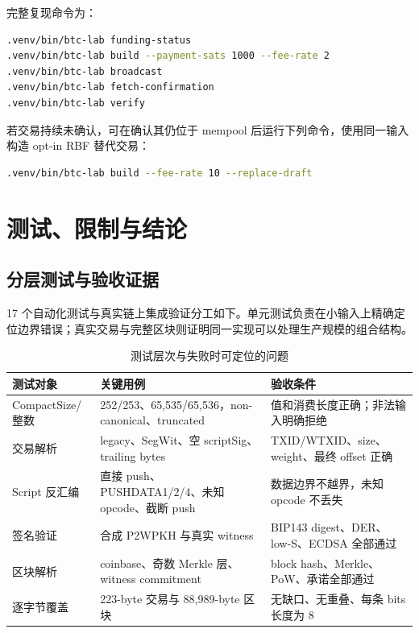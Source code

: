 \documentclass[11pt,a4paper,fontset=none]{ctexart}
\begin{document}
\clearpage
完整复现命令为：
\begin{lstlisting}[language=bash]
.venv/bin/btc-lab funding-status
.venv/bin/btc-lab build --payment-sats 1000 --fee-rate 2
.venv/bin/btc-lab broadcast
.venv/bin/btc-lab fetch-confirmation
.venv/bin/btc-lab verify
\end{lstlisting}
若交易持续未确认，可在确认其仍位于 mempool 后运行下列命令，使用同一输入构造 opt-in RBF 替代交易：
\begin{lstlisting}[language=bash]
.venv/bin/btc-lab build --fee-rate 10 --replace-draft
\end{lstlisting}

\section{测试、限制与结论}

\subsection{分层测试与验收证据}

17 个自动化测试与真实链上集成验证分工如下。单元测试负责在小输入上精确定位边界错误；真实交易与完整区块则证明同一实现可以处理生产规模的组合结构。

\begin{table}[H]
\centering
\caption{测试层次与失败时可定位的问题}
\label{tab:task1-tests}
\begin{tabular}{p{}p{}p{}}
\toprule
测试对象 & 关键用例 & 验收条件 \\
\midrule
CompactSize/整数 & 252/253、65,535/65,536，non-canonical、truncated & 值和消费长度正确；非法输入明确拒绝 \\
交易解析 & legacy、SegWit、空 scriptSig、trailing bytes & TXID/WTXID、size、weight、最终 offset 正确 \\
Script 反汇编 & 直接 push、PUSHDATA1/2/4、未知 opcode、截断 push & 数据边界不越界，未知 opcode 不丢失 \\
签名验证 & 合成 P2WPKH 与真实 witness & BIP143 digest、DER、low-S、ECDSA 全部通过 \\
区块解析 & coinbase、奇数 Merkle 层、witness commitment & block hash、Merkle、PoW、承诺全部通过 \\
逐字节覆盖 & 223-byte 交易与 88,989-byte 区块 & 无缺口、无重叠、每条 bits 长度为 8 \\
\bottomrule
\end{tabular}
\end{table}
\end{document}

